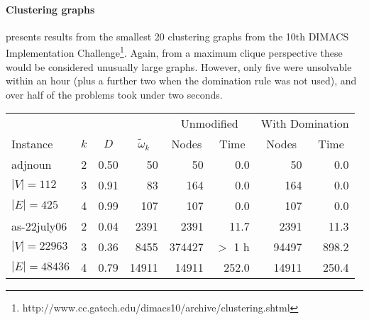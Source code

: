 \documentclass[letterpaper]{article}
\begin{document}
\paragraph{Clustering graphs}

 presents results from the smallest 20 clustering graphs
from the 10th DIMACS Implementation
Challenge\footnote{http://www.cc.gatech.edu/dimacs10/archive/clustering.shtml}. Again, from a
maximum clique perspective these would be considered unusually large graphs. However, only five were
unsolvable within an hour (plus a further two when the domination rule was not used), and over half of the
problems took under two seconds.

\begin{table}
    \scriptsize\setlength{\tabcolsep}{3.8pt} %
    \setlength{\aboverulesep}{-0.4pt}
    \centering
    \begin{tabular}{l c rr rr rr}
        \toprule
        & & & & \multicolumn{2}{c}{Unmodified} & \multicolumn{2}{c}{With Domination} \\
    \cmidrule(lr){5-6}
    \cmidrule(lr){7-8}
    Instance & \multicolumn{1}{c}{$k$} & \multicolumn{1}{c}{$D$} & \multicolumn{1}{c}{$\tilde{\omega}_k$} &
    \multicolumn{1}{c}{Nodes} & \multicolumn{1}{c}{Time} &
    \multicolumn{1}{c}{Nodes} & \multicolumn{1}{c}{Time} \\
    \midrule
adjnoun  & 2&0.50&50&50&0.0&50&0.0\\
\hspace*{0.2em}\color{gray}$|V|{=}112$& 3&0.91&83&164&0.0&164&0.0\\
\hspace*{0.2em}\color{gray}$|E|{=}425$& 4&0.99&107&107&0.0&107&0.0\\
as-22july06  & 2&0.04&2391&2391&11.7&2391&11.3\\
\hspace*{0.2em}\color{gray}$|V|{=}22963$& 3&0.36&8455&\color{gray}374427&\color{gray}$>$ 1 h&94497&898.2\\
\hspace*{0.2em}\color{gray}$|E|{=}48436$& 4&0.79&14911&14911&252.0&14911&250.4\\

\end{tabular}
\end{table}
\end{document}
